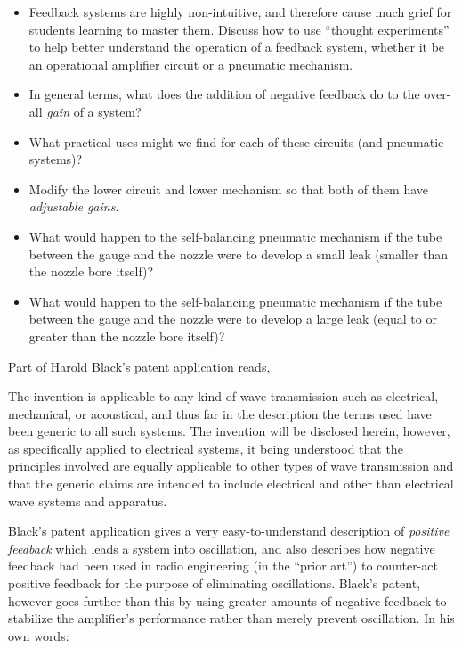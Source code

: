 \begin{itemize}
\item{} Feedback systems are highly non-intuitive, and therefore cause much grief for students learning to master them.  Discuss how to use ``thought experiments'' to help better understand the operation of a feedback system, whether it be an operational amplifier circuit or a pneumatic mechanism.
\item{} In general terms, what does the addition of negative feedback do to the over-all {\it gain} of a system?
\item{} What practical uses might we find for each of these circuits (and pneumatic systems)?
\item{} Modify the lower circuit and lower mechanism so that both of them have {\it adjustable gains}.
\item{} What would happen to the self-balancing pneumatic mechanism if the tube between the gauge and the nozzle were to develop a small leak (smaller than the nozzle bore itself)?
\item{} What would happen to the self-balancing pneumatic mechanism if the tube between the gauge and the nozzle were to develop a large leak (equal to or greater than the nozzle bore itself)?
\end{itemize}







Part of Harold Black's patent application reads,

\vskip 10pt {\narrower \noindent \baselineskip5pt

The invention is applicable to any kind of wave transmission such as electrical, mechanical, or acoustical, and thus far in the description the terms used have been generic to all such systems.  The invention will be disclosed herein, however, as specifically applied to electrical systems, it being understood that the principles involved are equally applicable to other types of wave transmission and that the generic claims are intended to include electrical and other than electrical wave systems and apparatus.

\par} \vskip 10pt

Black's patent application gives a very easy-to-understand description of {\it positive feedback} which leads a system into oscillation, and also describes how negative feedback had been used in radio engineering (in the ``prior art'') to counter-act positive feedback for the purpose of eliminating oscillations.  Black's patent, however goes further than this by using greater amounts of negative feedback to stabilize the amplifier's performance rather than merely prevent oscillation.  In his own words:

